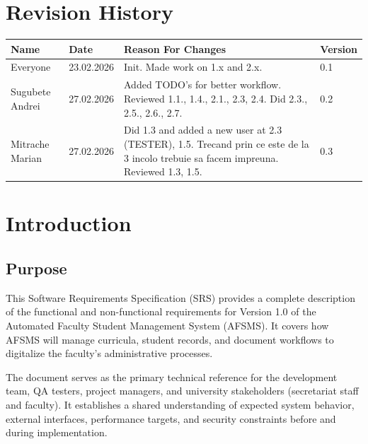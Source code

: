 \documentclass[11pt, a4paper]{article}
\begin{document}
\tableofcontents
\newpage

\section*{Revision History}

\begin{table}[htbp]
\centering
\begin{tabularx}{\textwidth}{l l X l}
\toprule
\textbf{Name} & \textbf{Date} & \textbf{Reason For Changes} & \textbf{Version} \\
\midrule
Everyone & 23.02.2026 & Init. Made work on 1.x and 2.x. & 0.1 \\
\midrule
Sugubete Andrei & 27.02.2026 & Added TODO's for better workflow. Reviewed 1.1., 1.4., 2.1., 2.3, 2.4. Did 2.3., 2.5., 2.6., 2.7. & 0.2 \\
\midrule
Mitrache Marian & 27.02.2026 & Did 1.3 and added a new user at 2.3 (TESTER), 1.5. Trecand prin ce este de la 3 incolo trebuie sa facem impreuna. Reviewed 1.3, 1.5. & 0.3 \\
\bottomrule
\end{tabularx}
\end{table}

\newpage

\section{Introduction}

\subsection{Purpose}
This Software Requirements Specification (SRS) provides a complete description of the functional and non-functional requirements for Version 1.0 of the Automated Faculty Student Management System (AFSMS). It covers how AFSMS will manage curricula, student records, and document workflows to digitalize the faculty's administrative processes.

The document serves as the primary technical reference for the development team, QA testers, project managers, and university stakeholders (secretariat staff and faculty). It establishes a shared understanding of expected system behavior, external interfaces, performance targets, and security constraints before and during implementation.
\end{document}
